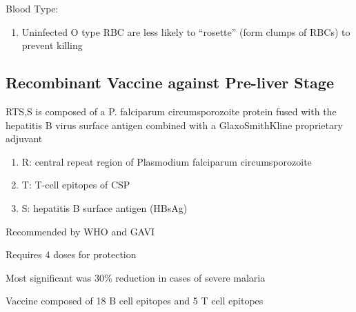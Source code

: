 \documentclass{notes}
\begin{document}
Blood Type:
\begin{enumerate}
    \item Uninfected O type RBC are less likely to ``rosette'' (form clumps of RBCs) to prevent killing
\end{enumerate}

\subsection*{Recombinant Vaccine against Pre-liver Stage}
RTS,S is composed of a P. falciparum circumsporozoite protein fused with the hepatitis B virus surface antigen combined with a GlaxoSmithKline proprietary adjuvant

\begin{enumerate}
    \item R: central repeat region of Plasmodium falciparum circumsporozoite
    \item T: T-cell epitopes of CSP
    \item S: hepatitis B surface antigen (HBsAg)
\end{enumerate}

Recommended by WHO and GAVI

Requires 4 doses for protection

Most significant was 30\% reduction in cases of severe malaria

Vaccine composed of 18 B cell epitopes and 5 T cell epitopes
\end{document}
